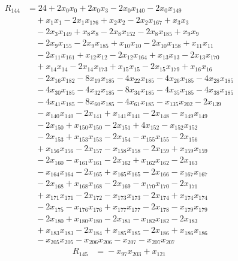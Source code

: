\begin{align*}
R_{144}&={}24 +2x_{0}x_{0} +2x_{0}x_{3} -2x_{0}x_{140} -2x_{0}x_{149}\\
&\quad{}+x_{1}x_{1} -2x_{1}x_{176} +x_{2}x_{2} -2x_{2}x_{167} +x_{3}x_{3}\\
&\quad{}-2x_{3}x_{149} +x_{8}x_{8} -2x_{8}x_{152} -2x_{8}x_{185} +x_{9}x_{9}\\
&\quad{}-2x_{9}x_{155} -2x_{9}x_{185} +x_{10}x_{10} -2x_{10}x_{158} +x_{11}x_{11}\\
&\quad{}-2x_{11}x_{161} +x_{12}x_{12} -2x_{12}x_{164} +x_{13}x_{13} -2x_{13}x_{170}\\
&\quad{}+x_{14}x_{14} -2x_{14}x_{173} +x_{15}x_{15} -2x_{15}x_{179} +x_{16}x_{16}\\
&\quad{}-2x_{16}x_{182} -8x_{19}x_{185} -4x_{22}x_{185} -4x_{26}x_{185} -4x_{28}x_{185}\\
&\quad{}-4x_{30}x_{185} -4x_{32}x_{185} -8x_{34}x_{185} -4x_{35}x_{185} -4x_{38}x_{185}\\
&\quad{}-4x_{41}x_{185} -8x_{60}x_{185} -4x_{61}x_{185} -x_{135}x_{202} -2x_{139}\\
&\quad{}-x_{140}x_{140} -2x_{141} +x_{141}x_{141} -2x_{148} -x_{149}x_{149}\\
&\quad{}-2x_{150} +x_{150}x_{150} -2x_{151} +4x_{152} -x_{152}x_{152}\\
&\quad{}-2x_{153} +x_{153}x_{153} -2x_{154} -x_{155}x_{155} -2x_{156}\\
&\quad{}+x_{156}x_{156} -2x_{157} -x_{158}x_{158} -2x_{159} +x_{159}x_{159}\\
&\quad{}-2x_{160} -x_{161}x_{161} -2x_{162} +x_{162}x_{162} -2x_{163}\\
&\quad{}-x_{164}x_{164} -2x_{165} +x_{165}x_{165} -2x_{166} -x_{167}x_{167}\\
&\quad{}-2x_{168} +x_{168}x_{168} -2x_{169} -x_{170}x_{170} -2x_{171}\\
&\quad{}+x_{171}x_{171} -2x_{172} -x_{173}x_{173} -2x_{174} +x_{174}x_{174}\\
&\quad{}-2x_{175} -x_{176}x_{176} +x_{177}x_{177} -2x_{178} -x_{179}x_{179}\\
&\quad{}-2x_{180} +x_{180}x_{180} -2x_{181} -x_{182}x_{182} -2x_{183}\\
&\quad{}+x_{183}x_{183} -2x_{184} +x_{185}x_{185} -2x_{186} +x_{186}x_{186}\\
&\quad{}-x_{205}x_{205} -x_{206}x_{206} -x_{207} -x_{207}x_{207}
\end{align*}
\begin{align*}
R_{145}&={}-x_{97}x_{203} +x_{121}
\end{align*}
